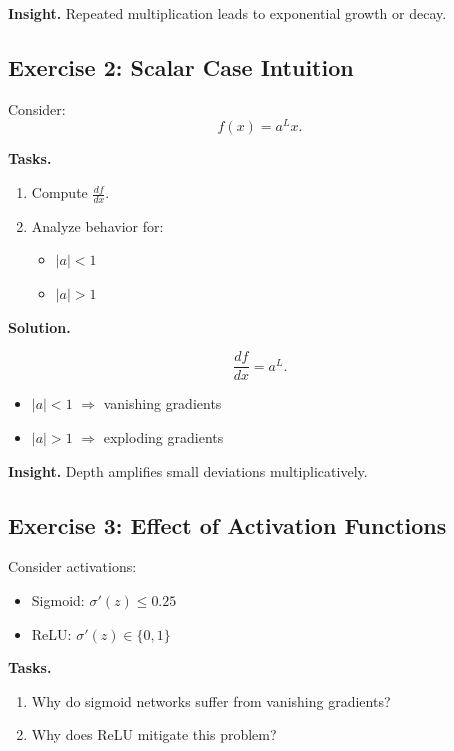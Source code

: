 \medskip

\noindent
\textbf{Insight.}  
Repeated multiplication leads to exponential growth or decay.

\subsection{Exercise 2: Scalar Case Intuition}

Consider:
\[
f(x) = a^L x.
\]

\medskip

\noindent
\textbf{Tasks.}
\begin{enumerate}
    \item Compute $\frac{df}{dx}$.
    \item Analyze behavior for:
    \begin{itemize}
        \item $|a| < 1$
        \item $|a| > 1$
    \end{itemize}
\end{enumerate}

\medskip

\noindent
\textbf{Solution.}

\[
\frac{df}{dx} = a^L.
\]

\begin{itemize}
    \item $|a| < 1$ $\Rightarrow$ vanishing gradients
    \item $|a| > 1$ $\Rightarrow$ exploding gradients
\end{itemize}

\medskip

\noindent
\textbf{Insight.}  
Depth amplifies small deviations multiplicatively.

\subsection{Exercise 3: Effect of Activation Functions}

Consider activations:

\begin{itemize}
    \item Sigmoid: $\sigma'(z) \leq 0.25$
    \item ReLU: $\sigma'(z) \in \{0,1\}$
\end{itemize}

\medskip

\noindent
\textbf{Tasks.}
\begin{enumerate}
    \item Why do sigmoid networks suffer from vanishing gradients?
    \item Why does ReLU mitigate this problem?
\end{enumerate}

